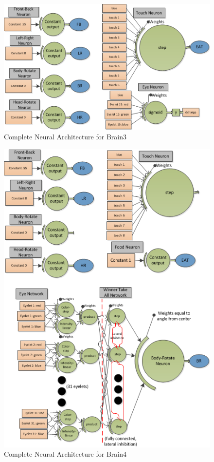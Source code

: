 \documentclass[a4paper,11pt]{article}
\begin{document}
\begin{figure}
\begin{center}
  \includegraphics[scale=1.0]{img/brain3complete.png}
  \caption{Complete Neural Architecture for Brain3 }
  \label{fig:brain3complete}
\end{center}
\end{figure}


\begin{figure}
\begin{center}
  \includegraphics[scale=1.0]{img/brain4complete.png}
  \caption{Complete Neural Architecture for Brain4 }
  \label{fig:brain4complete}
\end{center}
\end{figure}
\end{document}
